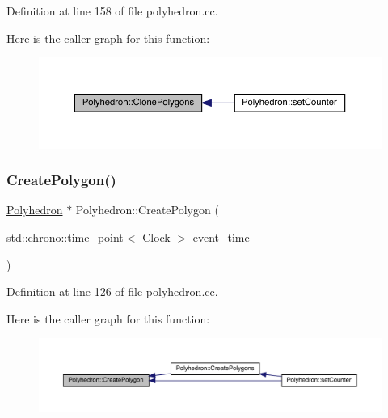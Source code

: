 Definition at line 158 of file polyhedron.\+cc.

Here is the caller graph for this function\+:
\nopagebreak
\begin{figure}[H]
\begin{center}
\leavevmode
\includegraphics[width=350pt]{class_polyhedron_ab4f57da9595dc92de7340cc46237a2ea_icgraph}
\end{center}
\end{figure}
\mbox{\label{class_polyhedron_ae5852dd26065d9f38ed293f8d95106ad}} 
\subsubsection{\texorpdfstring{Create\+Polygon()}{CreatePolygon()}}
{\footnotesize\ttfamily \hyperlink{class_polyhedron}{Polyhedron} $\ast$ Polyhedron\+::\+Create\+Polygon (\begin{DoxyParamCaption}\item[{std\+::chrono\+::time\+\_\+point$<$ \hyperlink{universe_8h_a0ef8d951d1ca5ab3cfaf7ab4c7a6fd80}{Clock} $>$}]{event\+\_\+time }\end{DoxyParamCaption})}



Definition at line 126 of file polyhedron.\+cc.

Here is the caller graph for this function\+:
\nopagebreak
\begin{figure}[H]
\begin{center}
\leavevmode
\includegraphics[width=350pt]{class_polyhedron_ae5852dd26065d9f38ed293f8d95106ad_icgraph}
\end{center}
\end{figure}
\mbox{\label{class_polyhedron_a1848eb8747c1132c40c2d27336af2896}} 
